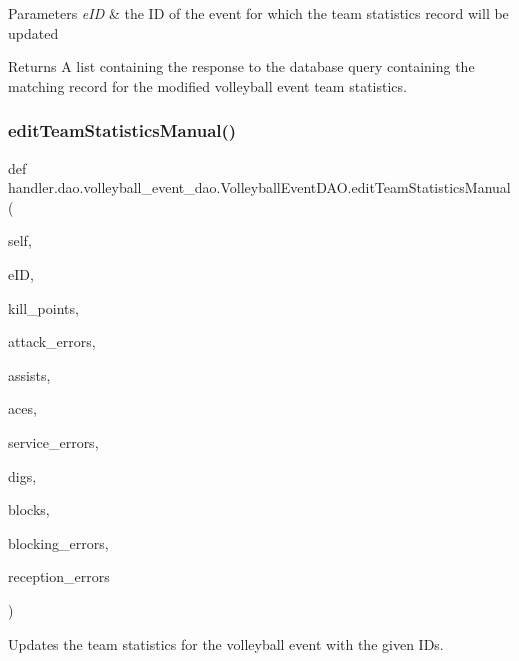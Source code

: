 \begin{DoxyParams}{Parameters}
{\em e\+ID} & the ID of the event for which the team statistics record will be updated\\
\hline
\end{DoxyParams}
\begin{DoxyReturn}{Returns}
A list containing the response to the database query containing the matching record for the modified volleyball event team statistics. 
\end{DoxyReturn}
\mbox{\label{classhandler_1_1dao_1_1volleyball__event__dao_1_1_volleyball_event_d_a_o_af01eb5df6258e5f21a446a7460a8f575}} 
\subsubsection{\texorpdfstring{edit\+Team\+Statistics\+Manual()}{editTeamStatisticsManual()}}
{\footnotesize\ttfamily def handler.\+dao.\+volleyball\+\_\+event\+\_\+dao.\+Volleyball\+Event\+D\+A\+O.\+edit\+Team\+Statistics\+Manual (\begin{DoxyParamCaption}\item[{}]{self,  }\item[{}]{e\+ID,  }\item[{}]{kill\+\_\+points,  }\item[{}]{attack\+\_\+errors,  }\item[{}]{assists,  }\item[{}]{aces,  }\item[{}]{service\+\_\+errors,  }\item[{}]{digs,  }\item[{}]{blocks,  }\item[{}]{blocking\+\_\+errors,  }\item[{}]{reception\+\_\+errors }\end{DoxyParamCaption})}



Updates the team statistics for the volleyball event with the given I\+Ds. 

